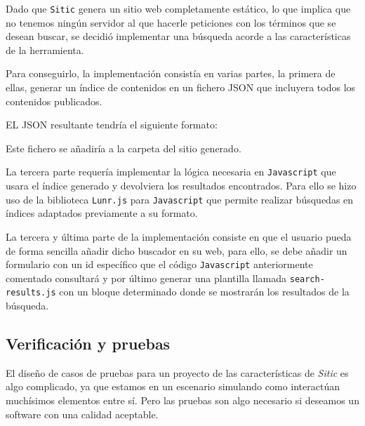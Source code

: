 \documentclass[a4paper,12pt]{article}
\begin{document}
Dado que \texttt{Sitic} genera un sitio web completamente estático, lo que implica que no tenemos ningún
servidor al que hacerle peticiones con los términos que se desean buscar, se decidió implementar
una búsqueda acorde a las características de la herramienta.

Para conseguirlo, la implementación consistía en varias partes, la primera de ellas, generar un índice de contenidos
en un fichero JSON que incluyera todos los contenidos publicados.

EL JSON resultante tendría el siguiente formato:

\begin{jsoncode}
\end{jsoncode}

Este fichero se añadiría a la carpeta del sitio generado.

La tercera parte requería implementar la lógica necesaria en \texttt{Javascript} que usara el índice generado
y devolviera los resultados encontrados. Para ello se hizo uso de la biblioteca \texttt{Lunr.js} para
\texttt{Javascript} que permite realizar búsquedas en índices adaptados previamente a su formato.

La tercera y última parte de la implementación consiste en que el usuario pueda de forma sencilla añadir dicho buscador en
su web, para ello, se debe añadir un formulario con un id específico que el código \texttt{Javascript} anteriormente
comentado consultará y por último generar una plantilla llamada \texttt{search-results.js} con un bloque
determinado donde se mostrarán los resultados de la búsqueda.

\subsection{Verificación y pruebas}

El diseño de casos de pruebas para un proyecto de las características de \emph{Sitic}
es algo complicado, ya que estamos en un escenario simulando como interactúan muchísimos
elementos entre sí. Pero las pruebas son algo necesario si deseamos un software con una
calidad aceptable.
\end{document}
